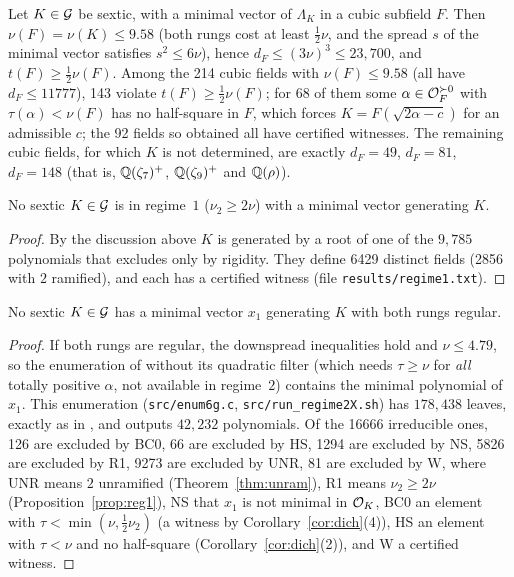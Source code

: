 \begin{proposition}\label{prop:cubicB}Let $K\in\mathcal{G}$ be sextic, with a minimal vector of $\Lambda_K$ in a cubic subfield $F$. Then $\nu(F)=\nu(K)\le9.58$ (both rungs cost at least $\frac12\nu$, and the spread $s$ of the minimal vector satisfies $s^{2}\le6\nu$), hence $d_F\le(3\nu)^{3}\le23{,}700$, and $t(F)\ge\frac12\nu(F)$. Among the 214 cubic fields with $\nu(F)\le9.58$ (all have $d_F\le11777$), 143 violate $t(F)\ge\frac12\nu(F)$; for 68 of them some $\alpha\in\mathcal{O}_F^{\succ 0}$ with $\tau(\alpha)<\nu(F)$ has no half-square in $F$, which forces $K=F(\sqrt{2\alpha-c})$ for an admissible $c$; the 92 fields so obtained all have certified witnesses. The remaining cubic fields, for which $K$ is not determined, are exactly $d_F=49$, $d_F=81$, $d_F=148$ (that is, $\mathbb{Q}(\zeta_7)^{+}$, $\mathbb{Q}(\zeta_9)^{+}$ and $\mathbb{Q}(\rho)$).\end{proposition}

\begin{proposition}\label{prop:reg1}No sextic $K\in\mathcal{G}$ is in regime~$1$ ($\nu_2\ge2\nu$) with a minimal vector generating $K$.\end{proposition}

\begin{proof}By the discussion above $K$ is generated by a root of one of the $9{,}785$ polynomials that \cite{TwoO} excludes only by rigidity. They define 6429 distinct fields (2856 with $2$ ramified), and each has a certified witness (file \texttt{results/regime1.txt}).\end{proof}

\begin{proposition}\label{prop:reg2X}No sextic $K\in\mathcal{G}$ has a minimal vector $x_1$ generating $K$ with both rungs regular.\end{proposition}\begin{proof}If both rungs are regular, the downspread inequalities hold and $\nu\le4.79$, so the enumeration of \cite{TwoO} without its quadratic filter (which needs $\tau\ge\nu$ for \emph{all} totally positive $\alpha$, not available in regime~$2$) contains the minimal polynomial of $x_1$. This enumeration (\texttt{src/enum6g.c}, \texttt{src/run\_regime2X.sh}) has $178{,}438$ leaves, exactly as in \cite{TwoO}, and outputs $42{,}232$ polynomials. Of the 16666 irreducible ones, 126 are excluded by BC0, 66 are excluded by HS, 1294 are excluded by NS, 5826 are excluded by R1, 9273 are excluded by UNR, 81 are excluded by W, where UNR means $2$ unramified (Theorem~\ref{thm:unram}), R1 means $\nu_2\ge2\nu$ (Proposition~\ref{prop:reg1}), NS that $x_1$ is not minimal in $\mathcal{O}_K$, BC0 an element with $\tau<\min(\nu,\frac12\nu_2)$ (a witness by Corollary~\ref{cor:dich}(4)), HS an element with $\tau<\nu$ and no half-square (Corollary~\ref{cor:dich}(2)), and W a certified witness.\end{proof}


